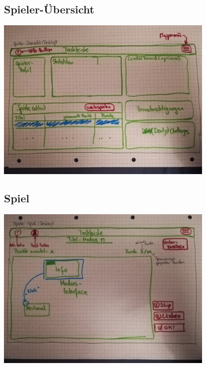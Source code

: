 \documentclass[a4paper]{scrreprt}
\begin{document}
    \subsection{Spieler-Übersicht}
        \centering
        \includegraphics[width=400px]{../pictures/5_Spieler.jpg}
    \subsection{Spiel}
        \centering
        \includegraphics[width=400px]{../pictures/6_Spiel.jpg}
\clearpage
\printglossary 
\end{document}
